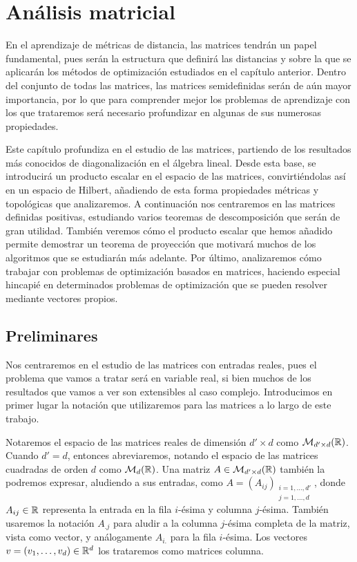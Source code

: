 \chapter{Análisis matricial} \label{chapter:matrices}

En el aprendizaje de métricas de distancia, las matrices tendrán un papel fundamental, pues serán la estructura que definirá las distancias y sobre la que se aplicarán los métodos de optimización estudiados en el capítulo anterior. Dentro del conjunto de todas las matrices, las matrices semidefinidas serán de aún mayor importancia, por lo que para comprender mejor los problemas de aprendizaje con los que trataremos será necesario profundizar en algunas de sus numerosas propiedades.

Este capítulo profundiza en el estudio de las matrices, partiendo de los resultados más conocidos de diagonalización en el álgebra lineal. Desde esta base, se introducirá un producto escalar en el espacio de las matrices, convirtiéndolas así en un espacio de Hilbert, añadiendo de esta forma propiedades métricas y topológicas que analizaremos. A continuación nos centraremos en las matrices definidas positivas, estudiando varios teoremas de descomposición que serán de gran utilidad. También veremos cómo el producto escalar que hemos añadido permite demostrar un teorema de proyección que motivará muchos de los algoritmos que se estudiarán más adelante. Por último, analizaremos cómo trabajar con problemas de optimización basados en matrices, haciendo especial hincapié en determinados problemas de optimización que se pueden resolver mediante vectores propios.

\section{Preliminares}

Nos centraremos en el estudio de las matrices con entradas reales, pues el problema que vamos a tratar será en variable real, si bien muchos de los resultados que vamos a ver son extensibles al caso complejo. Introducimos en primer lugar la notación que utilizaremos para las matrices a lo largo de este trabajo.

Notaremos el espacio de las matrices reales de dimensión $d' \times d$ como $\mathcal{M}_{d'\times d}(\mathbb{R})$. Cuando $d' = d$, entonces abreviaremos, notando el espacio de las matrices cuadradas de orden $d$ como $\mathcal{M}_d(\mathbb{R})$. Una matriz $A \in \mathcal{M}_{d'\times d}(\mathbb{R})$ también la podremos expresar, aludiendo a sus entradas, como $A = (A_{ij})_{\substack{i=1,\dots,d' \\ j=1,\dots,d}}$, donde $A_{ij} \in \mathbb{R}$ representa la entrada en la fila $i$-ésima y columna $j$-ésima. También usaremos la notación $A_{.j}$ para aludir a la columna $j$-ésima completa de la matriz, vista como vector, y análogamente $A_{i.}$ para la fila $i$-ésima. Los vectores $v = (v_1,\dots,v_d) \in \mathbb{R}^d$ los trataremos como matrices columna.

